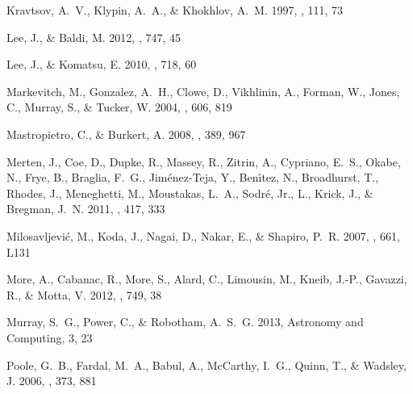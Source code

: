\documentclass{emulateapj}
\begin{document}
\begin{thebibliography}{28}
{Kravtsov}, A.~V., {Klypin}, A.~A., \& {Khokhlov}, A.~M. 1997, \apjs, 111, 73

{Lee}, J., \& {Baldi}, M. 2012, \apj, 747, 45

{Lee}, J., \& {Komatsu}, E. 2010, \apj, 718, 60

{Markevitch}, M., {Gonzalez}, A.~H., {Clowe}, D., {Vikhlinin}, A., {Forman},
  W., {Jones}, C., {Murray}, S., \& {Tucker}, W. 2004, \apj, 606, 819

{Mastropietro}, C., \& {Burkert}, A. 2008, \mnras, 389, 967

{Merten}, J., {Coe}, D., {Dupke}, R., {Massey}, R., {Zitrin}, A., {Cypriano},
  E.~S., {Okabe}, N., {Frye}, B., {Braglia}, F.~G., {Jim{\'e}nez-Teja}, Y.,
  {Ben{\'{\i}}tez}, N., {Broadhurst}, T., {Rhodes}, J., {Meneghetti}, M.,
  {Moustakas}, L.~A., {Sodr{\'e}}, Jr., L., {Krick}, J., \& {Bregman}, J.~N.
  2011, \mnras, 417, 333

{Milosavljevi{\'c}}, M., {Koda}, J., {Nagai}, D., {Nakar}, E., \& {Shapiro},
  P.~R. 2007, \apjl, 661, L131

{More}, A., {Cabanac}, R., {More}, S., {Alard}, C., {Limousin}, M., {Kneib},
  J.-P., {Gavazzi}, R., \& {Motta}, V. 2012, \apj, 749, 38

{Murray}, S.~G., {Power}, C., \& {Robotham}, A.~S.~G. 2013, Astronomy and
  Computing, 3, 23

{Poole}, G.~B., {Fardal}, M.~A., {Babul}, A., {McCarthy}, I.~G., {Quinn}, T.,
  \& {Wadsley}, J. 2006, \mnras, 373, 881


\end{thebibliography}
\end{document}
